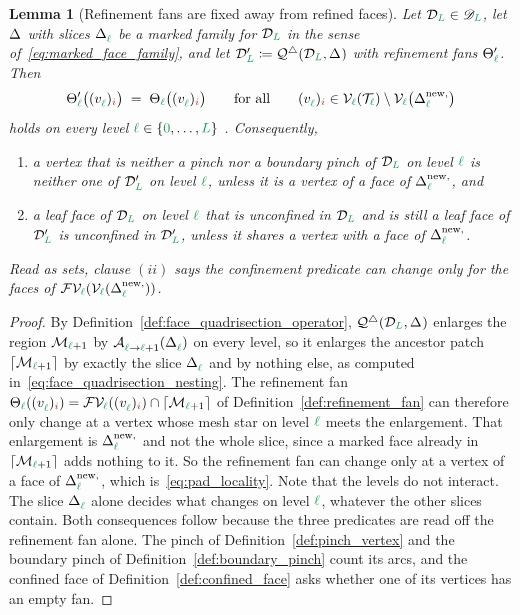 \documentclass[a4paper, 12pt]{article}
\makeatletter
\newcommand{\quadriF}{\mathcal{Q}^{\triangle}}                   %
\newcommand{\green}{\color{ForestGreen}}
\newcommand{\brickred}{\color{BrickRed}}
\newcommand{\T}{\mathcal{T}}
\newcommand{\V}{\mathcal{V}}
\newcommand{\F}{\mathcal{F}}
\DeclareRobustCommand{\simplexsubsetTwo}[2][]{\Delta\ifx\@empty#1\@empty\else^{#1}\fi_{#2}}
\DeclareRobustCommand{\simplexsubsetNew}[2][]{\Delta^{\mathrm{new}\ifx\@empty#1\@empty\else,#1\fi}_{#2}}
\newcommand{\vertex}[2]{\freeQ{v}{}{#1}{#2}}
\newcommand{\FVl}[1]{\F\V_{#1}}
\newcommand{\coarseIdxone}{{\brickred i}}
\renewcommand{\l}{{\green\ell}}
\renewcommand{\L}{{\green L}}
\newcommand{\lzero}{{\green 0}}
\newcommand{\freeQ}[4]{ ( {#1}^{#2}_{#3} )_{#4}}
\newcommand{\Aop}[3]{\mathcal{A}^{#1}_{{#2} \to {#3}}}
\newcommand{\M}{\mathcal{M}}
\newtheorem{lemma}[theorem]{Lemma}
\theoremstyle{definition}
\theoremstyle{plain}
\numberwithin{equation}{section}
\newcommand{\ancestorPatch}[1]{\lceil #1 \rceil}
\DeclareRobustCommand{\domseq}[1][]{\mathcal{D}\ifx\@empty#1\@empty\else_{#1}\fi}
\newcommand{\alldomseqs}{\mathscr{D}}
\newcommand{\refFan}[1]{\Theta_{#1}}                        %
\makeatother
\begin{document}
\begin{lemma}[Refinement fans are fixed away from refined faces]
    \label{lemma:pad_locality}
    Let $\domseq[\L] \in \alldomseqs_\L$, let $\simplexsubsetTwo{}$ with slices $\simplexsubsetTwo{\l}$ be a marked family for $\domseq[\L]$ in the sense of~\eqref{eq:marked_face_family}, and let $\domseq[\L]' \coloneq \quadriF(\domseq[\L], \simplexsubsetTwo{})$ with refinement fans $\refFan{\l}'$. Then
    \begin{equation}
        \label{eq:pad_locality}
        \refFan{\l}' \big( \vertex{\l}{\coarseIdxone} \big) \; = \; \refFan{\l} \big( \vertex{\l}{\coarseIdxone} \big) \qquad \text{for all} \qquad \vertex{\l}{\coarseIdxone} \in \V_\l(\T_\l) \setminus \V_\l \big( \simplexsubsetNew{\l} \big)
    \end{equation}
    holds on every level $\l \in \{ \lzero, \ldots, \L\}$ . Consequently,
    \begin{enumerate}[topsep=3pt, itemsep=-2pt]
        \item[$(i)$] a vertex that is neither a pinch nor a boundary pinch of $\domseq[\L]$ on level $\l$ is neither one of $\domseq[\L]'$ on level $\l$, unless it is a vertex of a face of $\simplexsubsetNew{\l}$, and
        \item[$(ii)$] a leaf face of $\domseq[\L]$ on level $\l$ that is unconfined in $\domseq[\L]$ and is still a leaf face of $\domseq[\L]'$ is unconfined in $\domseq[\L]'$, unless it shares a vertex with a face of $\simplexsubsetNew{\l}$.
    \end{enumerate}
    Read as sets, clause $(ii)$ says the confinement predicate can change only for the faces of $\FVl{\l} ( \V_\l ( \simplexsubsetNew{\l} ) )$.
\end{lemma}
\begin{proof}
    By Definition~\ref{def:face_quadrisection_operator}, $\quadriF(\domseq[\L], \simplexsubsetTwo{})$ enlarges the region $\M_{\l+1}$ by $\Aop{}{\l}{\l+1}(\simplexsubsetTwo{\l})$ on every level, so it enlarges the ancestor patch $\ancestorPatch{\M_{\l+1}}$ by exactly the slice $\simplexsubsetTwo{\l}$ and by nothing else, as computed in~\eqref{eq:face_quadrisection_nesting}. The refinement fan $\refFan{\l}(\vertex{\l}{\coarseIdxone}) = \FVl{\l}(\vertex{\l}{\coarseIdxone}) \cap \ancestorPatch{\M_{\l+1}}$ of Definition~\ref{def:refinement_fan} can therefore only change at a vertex whose mesh star on level $\l$ meets the enlargement. That enlargement is $\simplexsubsetNew{\l}$ and not the whole slice, since a marked face already in $\ancestorPatch{\M_{\l+1}}$ adds nothing to it. So the refinement fan can change only at a vertex of a face of $\simplexsubsetNew{\l}$, which is~\eqref{eq:pad_locality}. Note that the levels do not interact. The slice $\simplexsubsetTwo{\l}$ alone decides what changes on level $\l$, whatever the other slices contain. Both consequences follow because the three predicates are read off the refinement fan alone. The pinch of Definition~\ref{def:pinch_vertex} and the boundary pinch of Definition~\ref{def:boundary_pinch} count its arcs, and the confined face of Definition~\ref{def:confined_face} asks whether one of its vertices has an empty fan.
\end{proof}
\end{document}
